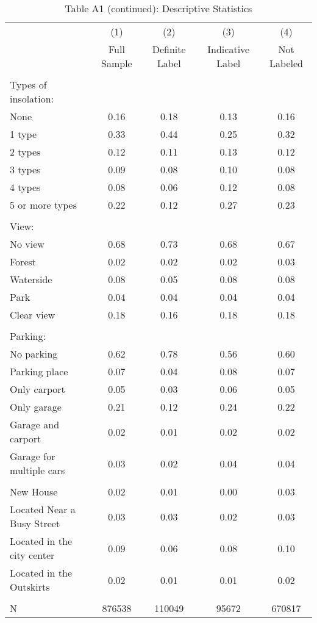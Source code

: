 \documentclass[12pt]{article}
\begin{document}
\begin{table}[H]
\scriptsize
  \centering
  \caption*{Table A1 (continued): Descriptive Statistics}
      \begin{tabular}{lcccc}
\hline
                &\multicolumn{1}{c}{(1)}&\multicolumn{1}{c}{(2)}&\multicolumn{1}{c}{(3)}&\multicolumn{1}{c}{(4)}\\
& Full Sample                      & Definite Label & Indicative Label & Not Labeled \\
\hline
&&&&\\
    Types of insolation: &       &       &       &  \\
    None  & 0.16  & 0.18  & 0.13  & 0.16 \\
    1 type & 0.33  & 0.44  & 0.25  & 0.32 \\
    2 types & 0.12  & 0.11  & 0.13  & 0.12 \\
    3 types & 0.09  & 0.08  & 0.10  & 0.08 \\
    4 types & 0.08  & 0.06  & 0.12  & 0.08 \\
    5 or more types & 0.22  & 0.12  & 0.27  & 0.23 \\
          &       &       &       &  \\
    View: &       &       &       &  \\
    No view & 0.68  & 0.73  & 0.68  & 0.67 \\
    Forest & 0.02  & 0.02  & 0.02  & 0.03 \\
    Waterside & 0.08  & 0.05  & 0.08  & 0.08 \\
    Park  & 0.04  & 0.04  & 0.04  & 0.04 \\
    Clear view & 0.18  & 0.16  & 0.18  & 0.18 \\
          &       &       &       &  \\
    Parking: &       &       &       &  \\
    No parking & 0.62  & 0.78  & 0.56  & 0.60 \\
    Parking place & 0.07  & 0.04  & 0.08  & 0.07 \\
    Only carport & 0.05  & 0.03  & 0.06  & 0.05 \\
    Only garage & 0.21  & 0.12  & 0.24  & 0.22 \\
    Garage and carport & 0.02  & 0.01  & 0.02  & 0.02 \\
    Garage for multiple cars & 0.03  & 0.02  & 0.04  & 0.04 \\
          &       &       &       &  \\
    New House & 0.02  & 0.01  & 0.00  & 0.03 \\
    Located Near a Busy Street & 0.03  & 0.03  & 0.02  & 0.03 \\
    Located in the city center & 0.09  & 0.06  & 0.08  & 0.10 \\
    Located in the Outskirts & 0.02  & 0.01  & 0.01  & 0.02 \\
          &       &       &       &  \\
    N     & 876538 & 110049 & 95672 & 670817 \\
\hline


\end{tabular}
\end{table}
\end{document}
